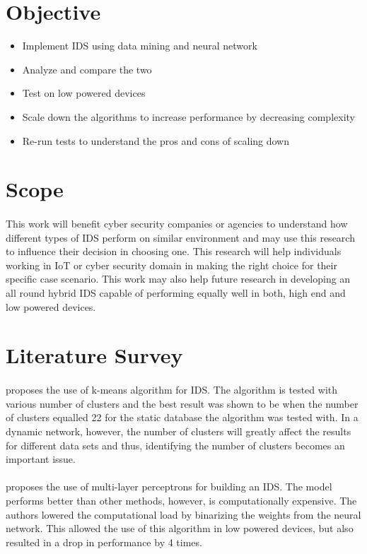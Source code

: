 \documentclass[a4paper,12pt]{article}
\begin{document}
	\section{Objective}
	\begin{itemize}
		\item Implement IDS using data mining and neural network
		\item Analyze and compare the two
		\item Test on low powered devices
		\item Scale down the algorithms to increase performance by decreasing complexity
		\item Re-run tests to understand the pros and cons of scaling down
	\end{itemize}
	\section{Scope}
	\paragraph{}
	This work will benefit cyber security companies or agencies to understand how different types of IDS perform on similar environment and may use this research to influence their decision in choosing one. This research will help individuals working in IoT or cyber security domain in making the right choice for their specific case scenario. This work may also help future research in developing an all round hybrid IDS capable of performing equally well in both, high end and low powered devices.

	\section{Literature Survey}
	\paragraph{}
	\cite{dm15} proposes the use of k-means algorithm for IDS. The algorithm is tested with various number of clusters and the best result was shown to be when the number of clusters equalled 22 for the static database the algorithm was tested with. In a dynamic network, however, the number of clusters will greatly affect the results for different data sets and thus, identifying the number of clusters becomes an important issue.
	\paragraph{}
	\cite{mlp17} proposes the use of multi-layer perceptrons for building an IDS. The model performs better than other methods, however, is computationally expensive. The authors lowered the computational load by binarizing the weights from the neural network. This allowed the use of this algorithm in low powered devices, but also resulted in a drop in performance by 4 times.
\end{document}
